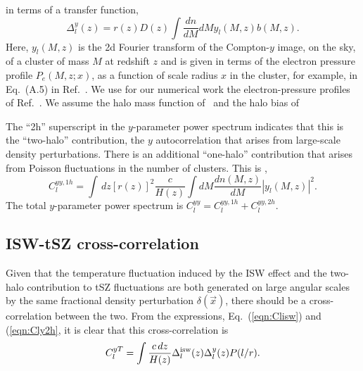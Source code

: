 \documentclass[aps,twocolumn,floats,prd,nofootinbib]{revtex4-1}
\begin{document}
in terms of a transfer function,
\begin{equation}
     \Delta_l^{y}(z) = r(z) D(z) \int \frac{dn}{dM}dM 
     y_l(M,z) b(M,z).
\end{equation}
Here, $y_l(M,z)$ is the 2d Fourier transform of the
Compton-$y$ image, on the sky, of a cluster of mass $M$ at
redshift $z$ and is given in terms of the electron pressure
profile $P_e(M,z;x)$, as a function of scale radius $x$ in the
cluster, for example, in Eq.~(A.5) in Ref.~\cite{Aghanim:2015eva}.
We use for our numerical work the electron-pressure profiles of
Ref.~\cite{Komatsu:2002wc}. We assume the halo mass function 
of~\cite{Tinker:2008ff} and the halo bias of~\cite{Sheth:1999mn}

The ``2h'' superscript in the
$y$-parameter power spectrum indicates that this is the
``two-halo'' contribution, the $y$ autocorrelation that arises
from large-scale density perturbations.  There is an additional
``one-halo'' contribution that arises from Poisson fluctuations
in the number of clusters.  This is
\cite{Komatsu:2002wc},
\begin{equation}
     C_l^{yy,1h} = \int\, dz \left[r(z)\right]^2\frac{c}{H(z)}
     \int dM \frac{dn(M,z)}{dM} \left| y_l(M,z)
     \right|^2.
\label{eqn:Cly1h}
\end{equation}
The total $y$-parameter power spectrum is $C_l^{yy} =
C_l^{yy,1h}+C_l^{yy,2h}$.  

\subsection{ISW-tSZ cross-correlation}

Given that the temperature fluctuation induced by the ISW effect
and the two-halo contribution to tSZ fluctuations are both
generated on large angular scales by the same fractional density
perturbation $\delta(\vec x)$, there should be a
cross-correlation between the two.  From the expressions,
Eq.~(\ref{eqn:Clisw}) and (\ref{eqn:Cly2h}, it is clear that this
cross-correlation is
\begin{equation}
     C_l^{yT} = \int \frac{c\, dz}{H(z)} \Delta^{\rm isw}_l(z)
     \Delta^y_l(z) P(l/r).
\label{eqn:Clcross}
\end{equation}
\end{document}
